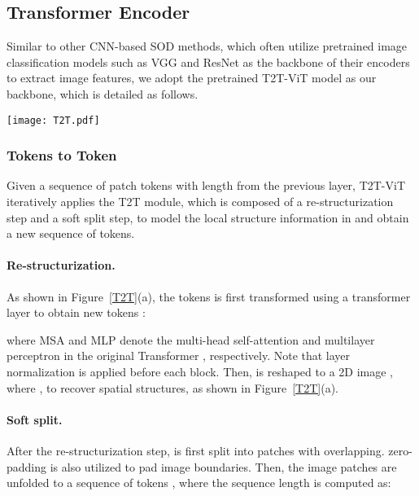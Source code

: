 \documentclass[10pt,twocolumn,letterpaper]{article}
\begin{document}
\subsection{Transformer Encoder}
Similar to other CNN-based SOD methods, which often utilize pretrained image classification models such as VGG \cite{simonyan2014vgg} and ResNet \cite{he2016resnet} as the backbone of their encoders to extract image features, we adopt the pretrained T2T-ViT \cite{yuan2021tokens} model as our backbone, which is detailed as follows.

\begin{figure*}[!t]
  \graphicspath{{Figures/Network/}}
  \centering
  \texttt{[image: T2T.pdf]}
\caption{The details of (a) T2T module \cite{yuan2021tokens} and (b) our proposed reverse T2T module. }
  \label{T2T}
  \vspace{-0.3cm}
\end{figure*}


\vspace{-3mm}
\subsubsection{Tokens to Token}
Given a sequence of patch tokens  with length  from the previous layer, T2T-ViT iteratively applies the T2T module, which is composed of a re-structurization step and a soft split step, to model the local structure information in  and obtain a new sequence of tokens.

\vspace{-3mm}
\paragraph{Re-structurization.}
As shown in Figure~\ref{T2T}(a), the tokens  is first transformed using a transformer layer to obtain new tokens :

where MSA and MLP denote the multi-head self-attention and multilayer perceptron in the original Transformer \cite{vaswani2017attention}, respectively. Note that layer normalization \cite{ba2016layer} is applied before each block.
Then,  is reshaped to a 2D image , where , to recover spatial structures, as shown in Figure~\ref{T2T}(a).

\vspace{-3mm}
\paragraph{Soft split.}
After the re-structurization step,  is first split into  patches with  overlapping.  zero-padding is also utilized to pad image boundaries. Then, the image patches are unfolded to a sequence of tokens , where the sequence length  is computed as:
\end{document}
